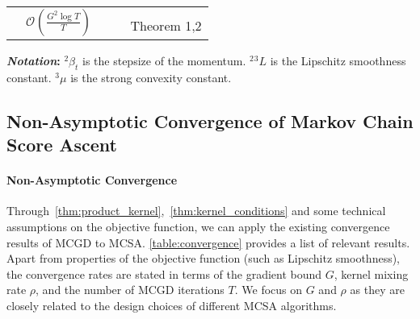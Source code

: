 \begin{table*}[t]
\begin{threeparttable}
\begin{tabular}{lllcc}
    & \multirow{2}{*}{\small\(\mathcal{O}\left(\frac{G^2 \log T}{ T}\right)\)}
    & {\footnotesize\citet{doan_finitetime_2020}}
    \\ 
    & {\footnotesize\(\gamma = \min\{\nicefrac{1}{2\,L}, \nicefrac{2 L}{\mu}\}\)}
    &&& {\footnotesize{Theorem 1,2}}
    \\ \bottomrule
  \end{tabular}
  \begin{tablenotes}[flushleft]
  \item[]{%
    \footnotesize\textbf{\textit{Notation}:}
    \(^2\)\(\beta_t\) is the stepsize of the momentum.
    \(^2\)\(^3\)\(L\) is the Lipschitz smoothness constant.
    \(^3\)\(\mu\) is the strong convexity constant.
  }
  \end{tablenotes}
\end{threeparttable}
\vspace{-0.2in}
\end{table*}

\vspace{-1.5ex}
\subsection{Non-Asymptotic Convergence of Markov Chain Score Ascent}%
\vspace{-1ex}
\paragraph{Non-Asymptotic Convergence}
Through~\cref{thm:product_kernel},~\cref{thm:kernel_conditions} and some technical assumptions on the objective function, we can apply the existing convergence results of MCGD to MCSA.
\pagebreak
\cref{table:convergence} provides a list of relevant results.
Apart from properties of the objective function (such as Lipschitz smoothness), the convergence rates are stated in terms of the gradient bound \(G\), kernel mixing rate \(\rho\), and the number of MCGD iterations \(T\).
We focus on \(G\) and \(\rho\) as they are closely related to the design choices of different MCSA algorithms.

\vspace{-0.1in}

